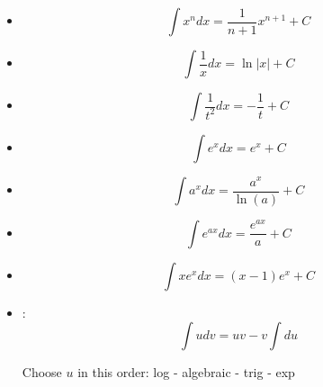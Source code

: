 \begin{multicols*}{3}


    \begin{itemize}
      \item \[\int x^n dx = \frac{1}{n + 1} x^{n + 1} + C \]
      \item \[\int \frac{1}{x} dx = \ln|x| + C \]
      \item \[\int \frac{1}{t^2} dx = - \frac{1}{t} + C\]
      \item \[\int e^x dx = e^x + C\]
      \item \[\int a^x dx = \frac{a^x}{\ln(a)} + C\]
      \item \[\int e^{ax} dx = \frac{e^{ax}}{a} + C\]
      \item \[\int x e^x dx = (x - 1)e^x + C\]
      \item {}:
        \[
          \int udv = uv - v \int du
        \]
        \par Choose $u$ in this order: log - algebraic - trig - exp
    \end{itemize}

\end{multicols*}

